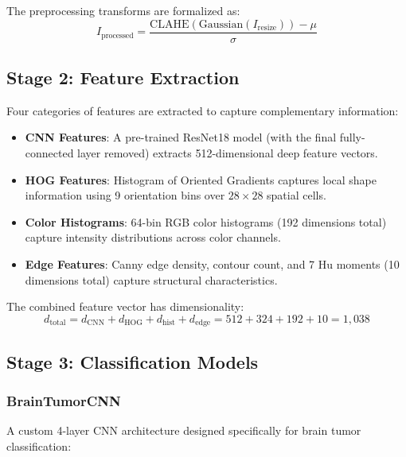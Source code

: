 \documentclass[conference]{IEEEtran}
\begin{document}
The preprocessing transforms are formalized as:
\begin{equation}
    I_{\text{processed}} = \frac{\text{CLAHE}(\text{Gaussian}(I_{\text{resize}})) - \mu}{\sigma}
\end{equation}

\subsection{Stage 2: Feature Extraction}
\label{subsec:features}
Four categories of features are extracted to capture complementary information:

\begin{itemize}
    \item \textbf{CNN Features}: A pre-trained ResNet18 model (with the final fully-connected layer removed) extracts 512-dimensional deep feature vectors.
    \item \textbf{HOG Features}: Histogram of Oriented Gradients captures local shape information using 9 orientation bins over $28 \times 28$ spatial cells.
    \item \textbf{Color Histograms}: 64-bin RGB color histograms (192 dimensions total) capture intensity distributions across color channels.
    \item \textbf{Edge Features}: Canny edge density, contour count, and 7 Hu moments (10 dimensions total) capture structural characteristics.
\end{itemize}

The combined feature vector has dimensionality:
\begin{equation}
    d_{\text{total}} = d_{\text{CNN}} + d_{\text{HOG}} + d_{\text{hist}} + d_{\text{edge}} = 512 + 324 + 192 + 10 = 1{,}038
\end{equation}

\subsection{Stage 3: Classification Models}
\label{subsec:models}

\subsubsection{BrainTumorCNN}
A custom 4-layer CNN architecture designed specifically for brain tumor classification:
\end{document}

